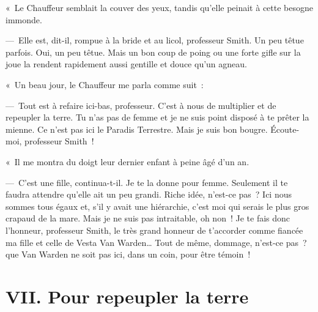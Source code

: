 \documentclass[french,twoside]{book} %
\newcommand\chapteropen{} %
\newcommand\chapterclose{} %
\begin{document}
« Le Chauffeur semblait la couver des yeux, tandis qu’elle peinait à cette besogne immonde.\par
— Elle est, dit-il, rompue à la bride et au licol, professeur Smith. Un peu têtue parfois. Oui, un peu têtue. Mais un bon coup de poing ou une forte gifle sur la joue la rendent rapidement aussi gentille et douce qu’un agneau.\par
« Un beau jour, le Chauffeur me parla comme suit :\par
— Tout est à refaire ici-bas, professeur. C’est à nous de multiplier et de repeupler la terre. Tu n’as pas de femme et je ne suis point disposé à te prêter la mienne. Ce n’est pas ici le Paradis Terrestre. Mais je suis bon bougre. Écoute-moi, professeur Smith !\par
« Il me montra du doigt leur dernier enfant à peine âgé d’un an.\par
— C’est une fille, continua-t-il. Je te la donne pour femme. Seulement il te faudra attendre qu’elle ait un peu grandi. Riche idée, n’est-ce pas ? Ici nous sommes tous égaux et, s’il y avait une hiérarchie, c’est moi qui serais le plus gros crapaud de la mare. Mais je ne suis pas intraitable, oh non ! Je te fais donc l’honneur, professeur Smith, le très grand honneur de t’accorder comme fiancée ma fille et celle de Vesta Van Warden… Tout de même, dommage, n’est-ce pas ? que Van Warden ne soit pas ici, dans un coin, pour être témoin !\par
\bigbreak
\chapterclose


\chapteropen

\chapter[{VII. Pour repeupler la terre}]{VII. Pour repeupler la terre}
\renewcommand{\leftmark}{VII. Pour repeupler la terre}
\end{document}
